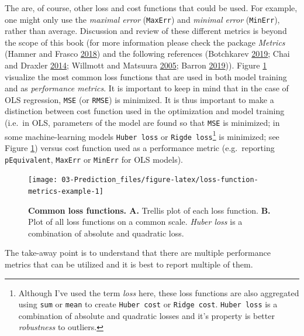 \documentclass[
]{book}
\begin{document}
The are, of course, other loss and cost functions that could be used. For example, one might only use the \emph{maximal error} (\texttt{MaxErr}) and \emph{minimal error} (\texttt{MinErr}), rather than average. Discussion and review of these different metrics is beyond the scope of this book (for more information please check the package \emph{Metrics} (Hamner and Frasco \protect\hyperlink{ref-R-Metrics}{2018}) and the following references (Botchkarev \protect\hyperlink{ref-botchkarevNewTypologyDesign2019}{2019}; Chai and Draxler \protect\hyperlink{ref-chaiRootMeanSquare2014}{2014}; Willmott and Matsuura \protect\hyperlink{ref-willmottAdvantagesMeanAbsolute2005}{2005}; Barron \protect\hyperlink{ref-barronGeneralAdaptiveRobust2019}{2019})). Figure \ref{fig:loss-function-metrics-example} visualize the most common loss functions that are used in both model training and as \emph{performance metrics}. It is important to keep in mind that in the case of OLS regression, \texttt{MSE} (or \texttt{RMSE}) is minimized. It is thus important to make a distinction between cost function used in the optimization and model training (i.e.~in OLS, parameters of the model are found so that \texttt{MSE} is minimized; in some machine-learning models \texttt{Huber\ loss} or \texttt{Rigde\ loss}\footnote{Although I've used the term \emph{loss} here, these loss functions are also aggregated using \texttt{sum} or \texttt{mean} to create \texttt{Huber\ cost} or \texttt{Ridge\ cost}. \texttt{Huber\ loss} is a combination of absolute and quadratic losses and it's property is better \emph{robustness} to outliers.} is minimized; see Figure \ref{fig:loss-function-metrics-example}) versus cost function used as a performance metric (e.g.~reporting \texttt{pEquivalent}, \texttt{MaxErr} or \texttt{MinErr} for OLS models).

\begin{figure}

{\centering \texttt{[image: 03-Prediction\_files/figure-latex/loss-function-metrics-example-1]} 

}

\caption{\textbf{Common loss functions. A. } Trellis plot of each loss function. \textbf{B.} Plot of all loss functions on a common scale. \emph{Huber loss} is a combination of absolute and quadratic loss.}\label{fig:loss-function-metrics-example}
\end{figure}



The take-away point is to understand that there are multiple performance metrics that can be utilized and it is best to report multiple of them.
\end{document}
